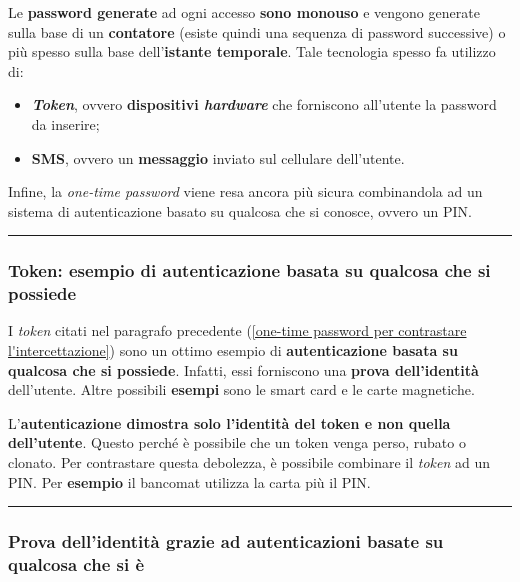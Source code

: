 \documentclass[a4paper]{article}
\newcommand{\longline}{\noindent\rule{\textwidth}{0.4pt}}
\begin{document}
	\noindent
	Le \textbf{password generate} ad ogni accesso \textbf{sono monouso} e vengono generate sulla base di un \textbf{contatore} (esiste quindi una sequenza di password successive) o più spesso sulla base dell'\textbf{istante temporale}. Tale tecnologia spesso fa utilizzo di:
	\begin{itemize}
		\item \textbf{\emph{Token}}, ovvero \textbf{dispositivi \emph{hardware}} che forniscono all'utente la password da inserire;
		
		\item \textbf{SMS}, ovvero un \textbf{messaggio} inviato sul cellulare dell'utente.
	\end{itemize}
	Infine, la \emph{one-time password} viene resa ancora più sicura combinandola ad un sistema di autenticazione basato su qualcosa che si conosce, ovvero un PIN.
	
	\longline
	
	\subsubsection{Token: esempio di autenticazione basata su qualcosa che si possiede}
	
	I \emph{token} citati nel paragrafo precedente (\ref{one-time password per contrastare l'intercettazione}) sono un ottimo esempio di \textbf{autenticazione basata su qualcosa che si possiede}. Infatti, essi forniscono una \textbf{prova dell'identità} dell'utente. Altre possibili \textcolor{Green4}{\textbf{esempi}} sono le smart card e le carte magnetiche.\newline
	
	\noindent
	L'\textbf{autenticazione dimostra solo l'identità del token e non quella dell'utente}. Questo perché è possibile che un token venga perso, rubato o clonato. Per contrastare questa debolezza, è possibile combinare il \emph{token} ad un PIN. Per \textcolor{Green4}{\textbf{esempio}} il bancomat utilizza la carta più il PIN.
	
	\longline
	
	\subsubsection{Prova dell'identità grazie ad autenticazioni basate su qualcosa che si è}
	
\end{document}
